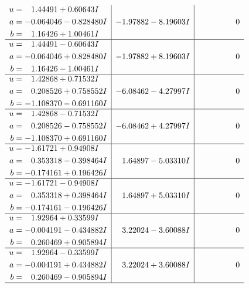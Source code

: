 \documentclass[1p]{elsarticle_modified}
\theoremstyle{definition}
\begin{document}
$$\begin{array}{c|c|c}
\begin{aligned}
u &= \phantom{-}1.44491 + 0.60643 I \\
a &= -0.064046 - 0.828480 I \\
b &= \phantom{-}1.16426 + 1.00461 I\end{aligned}
 & -1.97882 - 8.19603 I & \phantom{-0.000000 } 0 \\ \hline\begin{aligned}
u &= \phantom{-}1.44491 - 0.60643 I \\
a &= -0.064046 + 0.828480 I \\
b &= \phantom{-}1.16426 - 1.00461 I\end{aligned}
 & -1.97882 + 8.19603 I & \phantom{-0.000000 } 0 \\ \hline\begin{aligned}
u &= \phantom{-}1.42868 + 0.71532 I \\
a &= \phantom{-}0.208526 + 0.758552 I \\
b &= -1.108370 - 0.691160 I\end{aligned}
 & -6.08462 - 4.27997 I & \phantom{-0.000000 } 0 \\ \hline\begin{aligned}
u &= \phantom{-}1.42868 - 0.71532 I \\
a &= \phantom{-}0.208526 - 0.758552 I \\
b &= -1.108370 + 0.691160 I\end{aligned}
 & -6.08462 + 4.27997 I & \phantom{-0.000000 } 0 \\ \hline\begin{aligned}
u &= -1.61721 + 0.94908 I \\
a &= \phantom{-}0.353318 - 0.398464 I \\
b &= -0.174161 + 0.196426 I\end{aligned}
 & \phantom{-}1.64897 - 5.03310 I & \phantom{-0.000000 } 0 \\ \hline\begin{aligned}
u &= -1.61721 - 0.94908 I \\
a &= \phantom{-}0.353318 + 0.398464 I \\
b &= -0.174161 - 0.196426 I\end{aligned}
 & \phantom{-}1.64897 + 5.03310 I & \phantom{-0.000000 } 0 \\ \hline\begin{aligned}
u &= \phantom{-}1.92964 + 0.33599 I \\
a &= -0.004191 - 0.434882 I \\
b &= \phantom{-}0.260469 + 0.905894 I\end{aligned}
 & \phantom{-}3.22024 - 3.60088 I & \phantom{-0.000000 } 0 \\ \hline\begin{aligned}
u &= \phantom{-}1.92964 - 0.33599 I \\
a &= -0.004191 + 0.434882 I \\
b &= \phantom{-}0.260469 - 0.905894 I\end{aligned}
 & \phantom{-}3.22024 + 3.60088 I & \phantom{-0.000000 } 0\\
 \hline 
 \end{array}$$\newpage\newpage\renewcommand{\arraystretch}{1}
\end{document}
